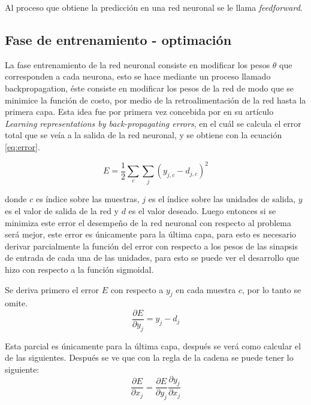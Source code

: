 \par Al proceso que obtiene la predicción en una red neuronal se le llama \textit{feedforward}.

\subsection{Fase de entrenamiento - optimación}

\par La fase entrenamiento de la red neuronal consiste en modificar los pesos $\theta$ que corresponden a cada neurona, esto se hace mediante un proceso llamado \gls{backpropagation}, éste consiste en modificar los pesos de la red de modo que se minimice la función de costo, por medio de la retroalimentación de la red hasta la primera capa. Esta idea fue por primera vez concebida por \textcite{rumelhart1986learning} en su artículo \textit{Learning representations by back-propagating errors}, en el cuál se calcula el error total que se veía a la salida de la red neuronal, y se obtiene con la ecuación \ref{eq:error}.

\begin{equation}\label{eq:error}
	E=\frac{1}{2}\sum _{c}\sum _{j}( y_{j,c} -d_{j,c})^{2}
\end{equation}

donde $c$ es índice sobre las muestras, $j$ es el índice sobre las unidades de salida, $y$ es el valor de salida de la red y $d$ es el valor deseado. Luego entonces si se minimiza este error el desempeño de la red neuronal con respecto al problema será mejor, este error es únicamente para la última capa, para esto es necesario derivar parcialmente la función del error con respecto a los pesos de las sinapsis de entrada de cada una de las unidades, para esto se puede ver el desarrollo que hizo \textcite{rumelhart1986learning} con respecto a la función sigmoidal.

\par Se deriva primero el error $E$ con respecto a $y_{j}$ en cada muestra $c$, por lo tanto se omite.
\begin{equation*}
	\frac{\partial E}{\partial y_{j}} =y_{j} -d_{j}
\end{equation*}
\par Esta parcial es únicamente para la última capa, después se verá como calcular el de las siguientes. Después se ve que con la regla de la cadena se puede tener lo siguiente:
\begin{equation*}
	\frac{\partial E}{\partial x_{j}} =\frac{\partial E}{\partial y_{j}}  \frac{\partial y_{j}}{\partial x_{j}}
\end{equation*}

